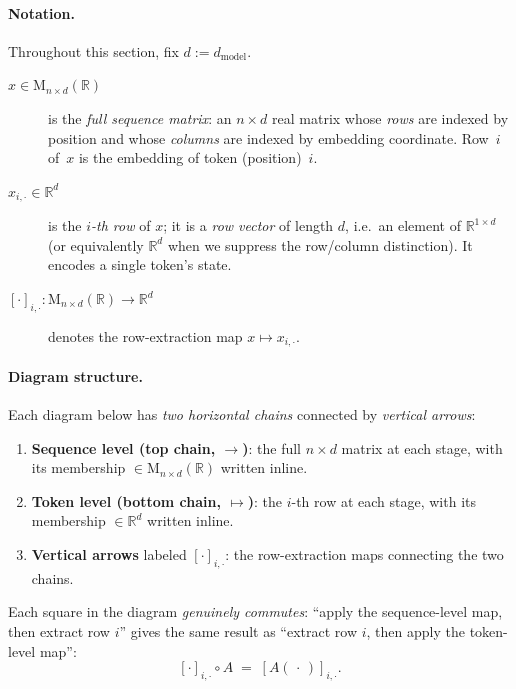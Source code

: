 \documentclass[11pt]{amsart}
\theoremstyle{plain}
\theoremstyle{definition}
\newcommand{\R}{\mathbb{R}}
\newcommand{\Mat}[2]{\mathrm{M}_{#1 \times #2}(\R)}
\begin{document}
\paragraph{Notation.}
Throughout this section, fix $d := d_{\mathrm{model}}$.
\begin{description}
  \item[$x \in \Mat{n}{d}$] is the \emph{full sequence matrix}: an $n\times d$
  real matrix whose \emph{rows} are indexed by position and whose \emph{columns}
  are indexed by embedding coordinate.  Row~$i$ of~$x$ is the embedding of token
  (position)~$i$.
  \item[$x_{i,\cdot} \in \R^{d}$] is the \emph{$i$-th row} of $x$; it is a
  \emph{row vector} of length $d$, i.e.\ an element of $\R^{1\times d}$ (or
  equivalently $\R^d$ when we suppress the row/column distinction).  It encodes a
  single token's state.
  \item[{$[\cdot]_{i,\cdot} : \Mat{n}{d} \to \R^{d}$}] denotes the row-extraction
  map $x \mapsto x_{i,\cdot}$.
\end{description}

\paragraph{Diagram structure.}
Each diagram below has \emph{two horizontal chains} connected by \emph{vertical
arrows}:
\begin{enumerate}[label=(\roman*)]
  \item \textbf{Sequence level (top chain, $\to$)}: the full $n\times d$ matrix
  at each stage, with its membership $\in\Mat{n}{d}$ written inline.
  \item \textbf{Token level (bottom chain, $\mapsto$)}: the $i$-th row at each
  stage, with its membership $\in\R^{d}$ written inline.
  \item \textbf{Vertical arrows} labeled $[\cdot]_{i,\cdot}$: the row-extraction
  maps connecting the two chains.
\end{enumerate}

\noindent Each square in the diagram \emph{genuinely commutes}:
``apply the sequence-level map, then extract row $i$'' gives the same result as
``extract row $i$, then apply the token-level map'':
\[
    [\cdot]_{i,\cdot} \circ A \;=\; [A(\,\cdot\,)]_{i,\cdot}.
\]
\end{document}
